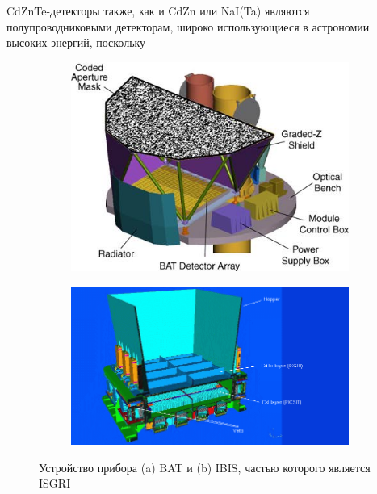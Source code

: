 	 CdZnTe-детекторы также, как и CdZn или NaI(Ta) являются полупроводниковыми детекторам, широко использующиеся в астрономии высоких энергий, поскольку %
	
	\begin{figure}[h!]
		\centering
			\begin{subfigure}[b]{0.49\linewidth}
			\includegraphics[width = \textwidth]{pictures/BAT.jpg}
			\caption{}
			\label{img:bat1}
		\end{subfigure}
		\begin{subfigure}[b]{0.49\linewidth}
		\centering
			\includegraphics[width = \textwidth]{pictures/INTEGRAL.png}
			\caption{}
			\label{img:int1}
		\end{subfigure}
		\caption{Устройство прибора (a) BAT и (b) IBIS, частью которого является ISGRI}
	\end{figure}
	
